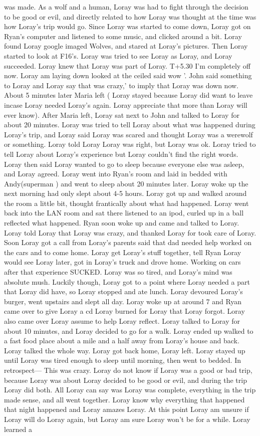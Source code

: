 \documentclass[12pt]{book}
\begin{document}
was made. As a wolf and a human, Loray was had to fight through the decision to be good or evil, and directly related to how Loray was thought at the time was how Loray's trip would go. Since Loray was started to come down, Loray got on Ryan's computer and listened to some music, and clicked around a bit. Loray found Loray google imaged Wolves, and stared at Loray's pictures. Then Loray started to look at F16's. Loray was tried to see Loray as Loray, and Loray succeeded. Loray knew that Loray was part of Loray. T+5.30 I'm completely off now. Loray am laying down looked at the ceiled said wow '. John said something to Loray and Loray say that was crazy,' to imply that Loray was down now. About 5 minutes later Maria left ( Loray stayed because Loray did want to leave incase Loray needed Loray's again. Loray appreciate that more than Loray will ever know). After Maria left, Loray sat next to John and talked to Loray for about 20 minutes. Loray was tried to tell Loray about what was happened during Loray's trip, and Loray said Loray was scared and thought Loray was a werewolf or something. Loray told Loray Loray was right, but Loray was ok. Loray tried to tell Loray about Loray's experience but Loray couldn't find the right words. Loray then said Loray wanted to go to sleep because everyone else was asleep, and Loray agreed. Loray went into Ryan's room and laid in bedded with Andy(superman ) and went to sleep about 20 minutes later. Loray woke up the next morning had only slept about 4-5 hours. Loray got up and walked around the room a little bit, thought frantically about what had happened. Loray went back into the LAN room and sat there listened to an ipod, curled up in a ball reflected what happened. Ryan soon woke up and came and talked to Loray. Loray told Loray that Loray was crazy, and thanked Loray for took care of Loray. Soon Loray got a call from Loray's parents said that dad needed help worked on the cars and to come home. Loray get Loray's stuff together, tell Ryan Loray would see Loray later, got in Loray's truck and drove home. Working on cars after that experience SUCKED. Loray was so tired, and Loray's mind was absolute mush. Luckily though, Loray got to a point where Loray needed a part that Loray did have, so Loray stopped and ate lunch. Loray devoured Loray's burger, went upstairs and slept all day. Loray woke up at around 7 and Ryan came over to give Loray a cd Loray burned for Loray that Loray forgot. Loray also came over Loray assume to help Loray reflect. Loray talked to Loray for about 10 minutes, and Loray decided to go for a walk. Loray ended up walked to a fast food place about a mile and a half away from Loray's house and back. Loray talked the whole way. Loray got back home, Loray left. Loray stayed up until Loray was tired enough to sleep until morning, then went to bedded. In retrospect--- This was crazy. Loray do not know if Loray was a good or bad trip, because Loray was about Loray decided to be good or evil, and during the trip Loray did both. All Loray can say was Loray was complete, everything in the trip made sense, and all went together. Loray know why everything that happened that night happened and Loray amazes Loray. At this point Loray am unsure if Loray will do Loray again, but Loray am sure Loray won't be for a while. Loray learned a 
\end{document}
